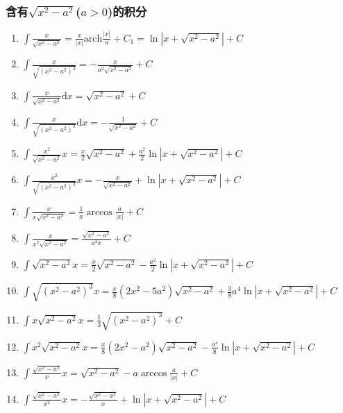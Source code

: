 \documentclass{book}
\begin{document}
\subsubsection{含有$\sqrt{x^2-a^2}$($a>0$)的积分}

\begin{enumerate}

\item $ \int \frac{ x}{\sqrt{x^2-a^2}} = \frac{x}{|x|} \mathrm{arch} \frac{|x|}{a} + C_1 = \ln\left|x+\sqrt{x^2-a^2}\right| + C $

\item $ \int \frac{ x}{\sqrt{(x^2-a^2)^3}} = -\frac{x}{a^2\sqrt{x^2-a^2}} + C$

\item $ \int \frac{x}{\sqrt{x^2-a^2}} \mathrm{d}x = \sqrt{x^2-a^2} + C $

\item $ \int \frac{x}{\sqrt{(x^2-a^2)^3}} \mathrm{d}x = -\frac{1}{\sqrt{x^2-a^2}} + C $

\item $ \int \frac{x^2}{\sqrt{x^2-a^2}}  x = \frac{x}{2}\sqrt{x^2-a^2} + \frac{a^2}{2}\ln|x+\sqrt{x^2-a^2}| + C $

\item $ \int \frac{x^2}{\sqrt{(x^2-a^2)^3}}  x = -\frac{x}{\sqrt{x^2-a^2}} + \ln|x+\sqrt{x^2-a^2}| + C $

\item $ \int \frac{ x}{x\sqrt{x^2-a^2}} = \frac{1}{a} \arccos \frac{a}{|x|} + C $

\item $ \int \frac{ x}{x^2\sqrt{x^2-a^2}} = \frac{\sqrt{x^2-a^2}}{a^2x} + C $

\item $ \int \sqrt{x^2-a^2}  x = \frac{x}{2}\sqrt{x^2-a^2} - \frac{a^2}{2}\ln|x + \sqrt{x^2-a^2}| + C $

\item $ \int \sqrt{(x^2-a^2)^3}  x = \frac{x}{8}(2x^2-5a^2)\sqrt{x^2-a^2} + \frac{3}{8}a^4\ln|x + \sqrt{x^2-a^2}| + C $

\item $ \int x \sqrt{x^2-a^2}  x = \frac{1}{3} \sqrt{(x^2-a^2)^3} + C $

\item $ \int x^2\sqrt{x^2-a^2}  x = \frac{x}{8}(2x^2-a^2)\sqrt{x^2-a^2} - \frac{a^4}{8}\ln|x+\sqrt{x^2-a^2}| + C $

\item $ \int \frac{\sqrt{x^2-a^2}}{x}  x = \sqrt{x^2-a^2} - a \arccos\frac{a}{|x|} + C $

\item $ \int \frac{\sqrt{x^2-a^2}}{x^2}  x = -\frac{\sqrt{x^2-a^2}}{x} + \ln|x + \sqrt{x^2-a^2}| + C $

\end{enumerate}
\end{document}
